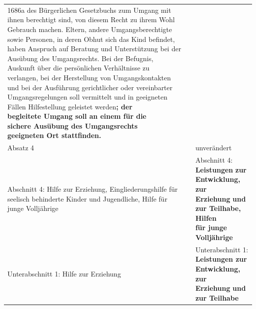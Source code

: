 \documentclass[10pt,a4paper,landscape]{article}
\begin{document}
\begin{longtable}{|L{8.2cm}|L{8.2cm}|L{8.2cm}|}
1686a  \newline des Bürgerlichen Gesetzbuchs zum  \newline Umgang mit ihnen berechtigt sind, von  \newline diesem Recht zu ihrem Wohl Gebrauch  \newline machen. Eltern, andere  \newline Umgangsberechtigte sowie Personen, in  \newline deren Obhut sich das Kind befindet, haben  \newline Anspruch auf Beratung und Unterstützung  \newline bei der Ausübung des Umgangsrechts. Bei  der Befugnis, Auskunft über die  \newline persönlichen Verhältnisse zu verlangen,  \newline bei der Herstellung von Umgangskontakten  \newline und bei der Ausführung gerichtlicher oder  \newline vereinbarter Umgangsregelungen soll  \newline vermittelt und in geeigneten Fällen  \newline Hilfestellung geleistet \textcolor{diffgreen}{werden}\textbf{\textcolor{diffgreen}{; der  \newline begleitete Umgang soll an einem für die  \newline sichere Ausübung des Umgangsrechts  \newline geeigneten Ort stattfinden.}} \\
\hhline{|---|}
Absatz 4 &  & unverändert \\
\hhline{|---|}
Abschnitt 4:   \newline \textcolor{diffred}{Hilfe} zur \textcolor{diffred}{Erziehung, Eingliederungshilfe für  \newline seelisch behinderte Kinder} und  \newline \textcolor{diffred}{Jugendliche, Hilfe} für junge Volljährige &  & Abschnitt 4:   \newline \textbf{\textcolor{diffgreen}{Leistungen}}\textbf{ zur }\textbf{\textcolor{diffgreen}{Entwicklung, zur  \newline Erziehung}}\textbf{ und }\textbf{\textcolor{diffgreen}{zur Teilhabe, Hilfen}}\textbf{  \newline für junge Volljährige} \\
\hhline{|---|}
Unterabschnitt 1:   \newline \textcolor{diffred}{Hilfe} zur Erziehung &  & Unterabschnitt 1: \textbf{\textcolor{diffgreen}{Leistungen zur Entwicklung,}}\textbf{ zur  \newline Erziehung }\textbf{\textcolor{diffgreen}{und zur Teilhabe}} \\

\end{longtable}
\end{document}
